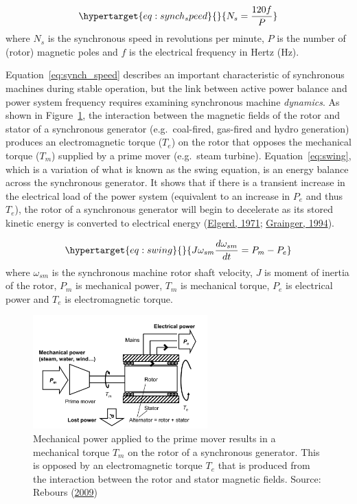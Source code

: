 \documentclass[12pt,a4paper,]{report}
\begin{document}
\begin{equation}\protect\hypertarget{eq:synch_speed}{}{N_s = \frac{120f}{P}}\label{eq:synch_speed}\end{equation}
where \(N_s\) is the synchronous speed in revolutions per minute, \(P\)
is the number of (rotor) magnetic poles and \(f\) is the electrical
frequency in Hertz (Hz).

Equation~\ref{eq:synch_speed} describes an important characteristic of
synchronous machines during stable operation, but the link between
active power balance and power system frequency requires examining
synchronous machine \emph{dynamics}. As shown in
Figure~\ref{fig:synch_torques}, the interaction between the magnetic
fields of the rotor and stator of a synchronous generator
(e.g.~coal-fired, gas-fired and hydro generation) produces an
electromagnetic torque (\(T_e\)) on the rotor that opposes the
mechanical torque (\(T_m\)) supplied by a prime mover (e.g.~steam
turbine). Equation~\ref{eq:swing}, which is a variation of what is known
as the swing equation, is an energy balance across the synchronous
generator. It shows that if there is a transient increase in the
electrical load of the power system (equivalent to an increase in
\(P_e\) and thus \(T_e\)), the rotor of a synchronous generator will
begin to decelerate as its stored kinetic energy is converted to
electrical energy
(\protect\hyperlink{ref-elgerdElectricEnergySystems1971}{Elgerd, 1971};
\protect\hyperlink{ref-graingerPowerSystemAnalysis1994}{Grainger,
1994}).

\begin{equation}\protect\hypertarget{eq:swing}{}{J\omega_{sm}\frac{d\omega_{sm}}{dt} = P_m - P_e}\label{eq:swing}\end{equation}
where \(\omega_{sm}\) is the synchronous machine rotor shaft velocity,
\(J\) is moment of inertia of the rotor, \(P_m\) is mechanical power,
\(T_m\) is mechanical torque, \(P_e\) is electrical power and \(T_e\) is
electromagnetic torque.

\begin{figure}
\hypertarget{fig:synch_torques}{%
\centering
\includegraphics[width=0.6\textwidth,height=\textheight]{source/figures/swing.png}
\caption[Mechanical and electromagnetic torques on a synchronous
generator]{Mechanical power applied to the prime mover results in a
mechanical torque \(T_m\) on the rotor of a synchronous generator. This
is opposed by an electromagnetic torque \(T_e\) that is produced from
the interaction between the rotor and stator magnetic fields. Source:
Rebours
(\protect\hyperlink{ref-reboursComprehensiveAssessmentMarkets2009}{2009})}\label{fig:synch_torques}
}
\end{figure}
\end{document}
